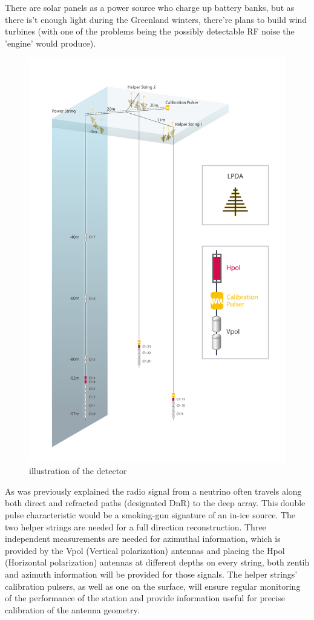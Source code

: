 \documentclass[11pt,a4paper,faculty=we,language=en,doctype=report]{cls/ugent-doc}
\begin{document}
There are solar panels as a power source who charge up battery banks, but as
there is't enough light during the Greenland winters, there're plans to build
wind turbines (with one of the problems being the possibly detectable RF noise
the 'engine' would produce).

\begin{figure}
	\centering
	\includegraphics[height=0.9\textheight]{figures/detector.pdf}	
	\caption{illustration of the detector}
	\label{fig:detector}
\end{figure}
As was previously explained the radio signal from a neutrino often travels
along both direct and refracted paths (designated DnR) to the deep array. 
This double pulse characteristic would be a smoking-gun signature of an in-ice
source. The two helper strings are needed for a full direction reconstruction.
Three independent measurements are needed for azimuthal information, which is
provided by the Vpol (Vertical polarization) antennas and placing the Hpol
(Horizontal polarization) antennas at different depths on every string, both
zentih and azimuth information will be provided for those signals. The helper
strings' calibration pulsers, as well as one on the surface, will ensure
regular monitoring of the performance of the station and provide information
useful for precise calibration of the antenna geometry.
\end{document}
